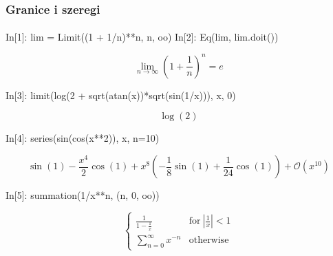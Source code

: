 \documentclass[10pt]{beamer}
\begin{document}
\begin{frame}[fragile]
  \frametitle{Granice i szeregi}
  \framesubtitle{}

  \begin{python}
    In[1]: lim = Limit((1 + 1/n)**n, n, oo)
    In[2]: Eq(lim, lim.doit())
  \end{python}
  \begin{equation*}
    \lim_{n \to \infty} \left(1 + \frac{1}{n}\right)^{n} = e
  \end{equation*}

  \begin{python}
    In[3]: limit(log(2 + sqrt(atan(x))*sqrt(sin(1/x))), x, 0)
  \end{python}
  \begin{equation*}
    \log{\left (2 \right )}
  \end{equation*}

  \begin{python}
    In[4]: series(sin(cos(x**2)), x, n=10)
  \end{python}
  \begin{equation*}
    \sin{\left (1 \right )} - \frac{x^{4}}{2} \cos{\left (1 \right )} + x^{8} \left(- \frac{1}{8} \sin{\left (1 \right )} + \frac{1}{24} \cos{\left (1 \right )}\right) + \mathcal{O}\left(x^{10}\right)
  \end{equation*}

  \begin{python}
    In[5]: summation(1/x**n, (n, 0, oo))
  \end{python}
  \begin{equation*}
    \begin{cases} \frac{1}{1 - \frac{1}{x}} & \text{for}\: \left|{\frac{1}{x}}\right| < 1 \\\sum_{n=0}^{\infty} x^{- n} & \text{otherwise} \end{cases}
  \end{equation*}
\end{frame}
\end{document}
